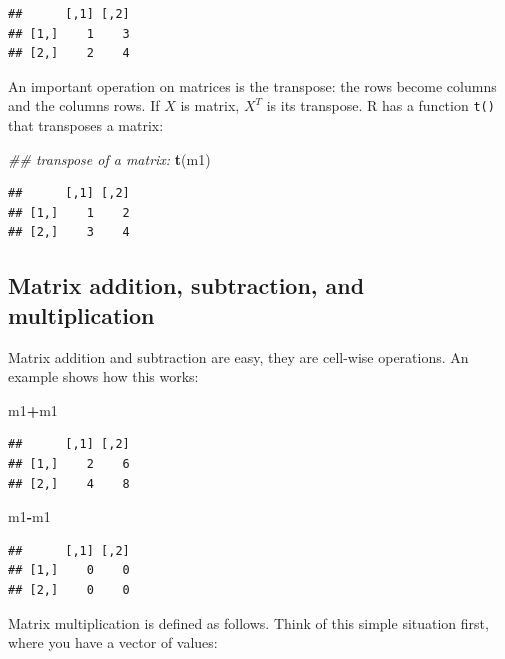 \documentclass[12pt,]{krantz}
\newenvironment{Shaded}{\begin{snugshade}}{\end{snugshade}}
\newcommand{\CommentTok}[1]{\textcolor[rgb]{0.56,0.35,0.01}{\textit{#1}}}
\newcommand{\KeywordTok}[1]{\textcolor[rgb]{0.13,0.29,0.53}{\textbf{#1}}}
\newcommand{\NormalTok}[1]{#1}
\newcommand{\OperatorTok}[1]{\textcolor[rgb]{0.81,0.36,0.00}{\textbf{#1}}}
\begin{document}
\begin{verbatim}
##      [,1] [,2]
## [1,]    1    3
## [2,]    2    4
\end{verbatim}

An important operation on matrices is the transpose: the rows become columns and the columns rows. If \(X\) is matrix, \(X^T\) is its transpose. R has a function \texttt{t()} that transposes a matrix:

\begin{Shaded}
\begin{Highlighting}[]
\CommentTok{## transpose of a matrix:}
\KeywordTok{t}\NormalTok{(m1)}
\end{Highlighting}
\end{Shaded}

\begin{verbatim}
##      [,1] [,2]
## [1,]    1    2
## [2,]    3    4
\end{verbatim}

\hypertarget{matrix-addition-subtraction-and-multiplication}{%
\subsection{Matrix addition, subtraction, and multiplication}\label{matrix-addition-subtraction-and-multiplication}}

Matrix addition and subtraction are easy, they are cell-wise operations. An example shows how this works:

\begin{Shaded}
\begin{Highlighting}[]
\NormalTok{m1}\OperatorTok{+}\NormalTok{m1}
\end{Highlighting}
\end{Shaded}

\begin{verbatim}
##      [,1] [,2]
## [1,]    2    6
## [2,]    4    8
\end{verbatim}

\begin{Shaded}
\begin{Highlighting}[]
\NormalTok{m1}\OperatorTok{-}\NormalTok{m1}
\end{Highlighting}
\end{Shaded}

\begin{verbatim}
##      [,1] [,2]
## [1,]    0    0
## [2,]    0    0
\end{verbatim}

Matrix multiplication is defined as follows. Think of this simple situation first, where you have a vector of values:
\end{document}
